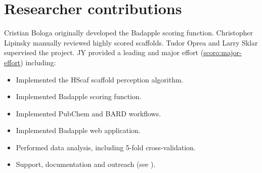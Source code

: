 \section{Researcher contributions}

Cristian Bologa originally developed the Badapple scoring function. Christopher Lipinsky manually reviewed highly scored scaffolds. Tudor Oprea and Larry Sklar supervised the project. JY provided a leading and major effort (\href{http://purl.org/spar/scoro/major-effort}{scoro:major-effort}) including:

\begin{itemize}[topsep=0pt,itemsep=0pt,partopsep=0pt,parsep=0pt]
    \item Implemented the HScaf scaffold perception algorithm.
    \item Implemented Badapple scoring function.
    \item Implemented PubChem and BARD workflows.
    \item Implemented Badapple web application.
    \item Performed data analysis, including 5-fold cross-validation.
    \item Support, documentation and outreach (see ).
\end{itemize}

